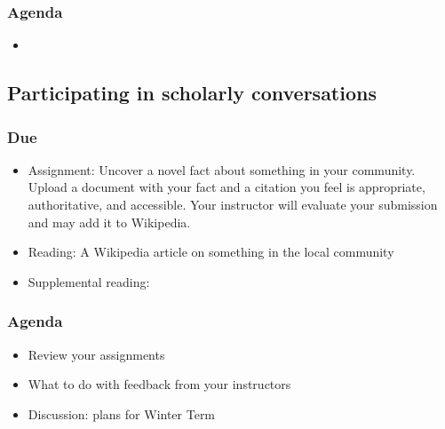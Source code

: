 \documentclass[12pt,article,oneside]{memoir}
\begin{document}
\subsubsection{Agenda}
\begin{itemize}
\item 
\end{itemize}


\subsection{Participating in scholarly conversations}
\subsubsection{Due}
\begin{itemize}
 \item Assignment: Uncover a novel fact about something in your community.  Upload a document with your fact and a citation you feel is appropriate, authoritative, and accessible.  Your instructor will evaluate your submission and may add it to Wikipedia.
 \item Reading: A Wikipedia article on something in the local community
 \item Supplemental reading: \cite{doyle}
\end{itemize}

\subsubsection{Agenda}
\begin{itemize}
\item Review your assignments
\item What to do with feedback from your instructors
\item Discussion: plans for Winter Term
\end{itemize}



\newpage
\renewcommand{\bibname}{Reading list}
{}

\end{document}

